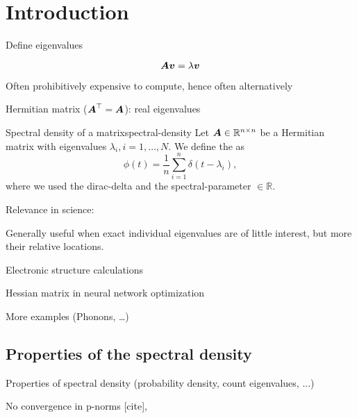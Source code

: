 \chapter{Introduction}
\label{chp:1-introduction}

Define eigenvalues

\begin{equation}
    \boldsymbol{A} \boldsymbol{v} = \lambda \boldsymbol{v}
    \label{equ:1-introduction-eigenvalue}
\end{equation}

Often prohibitively expensive to compute, hence often alternatively

Hermitian matrix ($\boldsymbol{A}^{\top} = \boldsymbol{A}$): real eigenvalues 

\begin{definition}{Spectral density of a matrix}{spectral-density}
    Let $\boldsymbol{A} \in \mathbb{R}^{n \times n}$ be a Hermitian matrix with eigenvalues $\lambda_i, i=1, \dots, N$.
    We define the  as
    \begin{equation}
        \phi(t) = \frac{1}{n} \sum_{i=1}^{n} \delta(t - \lambda_i),
        \label{equ:1-introduction-def-spectral-density}
    \end{equation}
    where we used the \gls{dirac-delta} \cite[Chapter~15]{dirac1947quantum}
    and the \gls{spectral-parameter} $\in \mathbb{R}$.
\end{definition}

Relevance in science:

Generally useful when exact individual eigenvalues are of little interest, but
more their relative locations.

Electronic structure calculations \cite{ducastelle1970charge, haydock1972electronic, lin2017randomized}

Hessian matrix in neural network optimization \cite{ghorbani2019investigation}

More examples (Phonons, \dots)


\section{Properties of the spectral density}
\label{sec:1-introduction-properties}

Properties of spectral density (probability density, count eigenvalues, ...)

No convergence in p-norms [cite],

